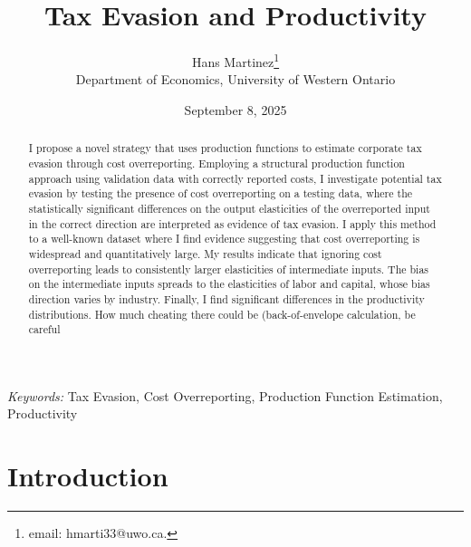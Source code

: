 \documentclass[
  12pt]{article}
\renewcommand*\contentsname{Table of contents}
\newcommand\contentsname{Table of contents}
\theoremstyle{definition}
\theoremstyle{remark}
\begin{document}
\def\spacingset#1{\renewcommand{\baselinestretch}%
{#1}\small\normalsize} \spacingset{1}



\date{September 8, 2025}
\title{\bf Tax Evasion and Productivity}
\author{
Hans Martinez\thanks{email: hmarti33@uwo.ca.}\\
Department of Economics, University of Western Ontario\\
}
\maketitle

\bigskip
\bigskip
\begin{abstract}
I propose a novel strategy that uses production functions to estimate
corporate tax evasion through cost overreporting. Employing a structural
production function approach using validation data with correctly
reported costs, I investigate potential tax evasion by testing the
presence of cost overreporting on a testing data, where the
statistically significant differences on the output elasticities of the
overreported input in the correct direction are interpreted as evidence
of tax evasion. I apply this method to a well-known dataset where I find
evidence suggesting that cost overreporting is widespread and
quantitatively large. My results indicate that ignoring cost
overreporting leads to consistently larger elasticities of intermediate
inputs. The bias on the intermediate inputs spreads to the elasticities
of labor and capital, whose bias direction varies by industry. Finally,
I find significant differences in the productivity distributions. How
much cheating there could be (back-of-envelope calculation, be careful
\end{abstract}

\noindent%
{\it Keywords:} Tax Evasion, Cost Overreporting, Production Function
Estimation, Productivity
\vfill

\newpage
\spacingset{1.9} %

\renewcommand*\contentsname{Table of contents}
{
\hypersetup{linkcolor=}
\setcounter{tocdepth}{3}
\tableofcontents
}
\section*{Introduction}\label{introduction}
\end{document}
